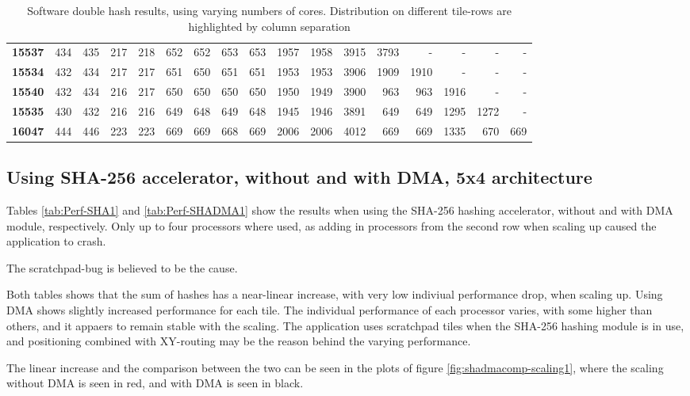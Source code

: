 \begin{appendix}
\begin{table}
\begin{tabular}{| l || r r r r | r r r r | r r r | r r r r r |}
  \textbf{15537} & 434 & 435 & 217 & 218 & 652 & 652 & 653 & 653 & 1957 & 1958 & 3915 &3793 & - & - & - & -\\
  \textbf{15534} & 432 & 434 & 217 & 217 & 651 & 650 & 651 & 651 & 1953 & 1953 & 3906 & 1909 & 1910 & - & - & -\\
  \textbf{15540} & 432 & 434 & 216 & 217 & 650 & 650 & 650 & 650 & 1950 & 1949 & 3900 & 963 & 963 & 1916 & - & -\\
  \textbf{15535} & 430 & 432 & 216 & 216 & 649 & 648 & 649 & 648 & 1945 & 1946 & 3891 & 649 & 649 & 1295 & 1272 & -\\
  \textbf{16047} & 444 & 446 & 223 & 223 & 669 & 669 & 668 & 669 & 2006 & 2006 & 4012 & 669 & 669 & 1335 & 670 & 669\\
  \hline  
\end{tabular}
\caption{Software double hash results, using varying numbers of cores. Distribution on different tile-rows are highlighted by column separation}
\label{tab:Full-Perf-SW1}
\end{table}


\subsection{Using SHA-256 accelerator, without and with DMA, 5x4 architecture}
Tables \ref{tab:Perf-SHA1} and \ref{tab:Perf-SHADMA1} show the results when using the SHA-256 hashing accelerator, without and with DMA module, respectively.
Only up to four processors where used, as adding in processors from the second row when scaling up caused the application to crash.

The scratchpad-bug is believed to be the cause.

Both tables shows that the sum of hashes has a near-linear increase, with very low indiviual performance drop, when scaling up.
Using DMA shows slightly increased performance for each tile.
The individual performance of each processor varies, with some higher than others, and it appaers to remain stable with the scaling. 
The application uses scratchpad tiles when the SHA-256 hashing module is in use, and positioning combined with XY-routing may be the reason behind the varying performance.

The linear increase and the comparison between the two can be seen in the plots of figure \ref{fig:shadmacomp-scaling1}, where the scaling without DMA is seen in red, and with DMA is seen in black.


\end{appendix}
